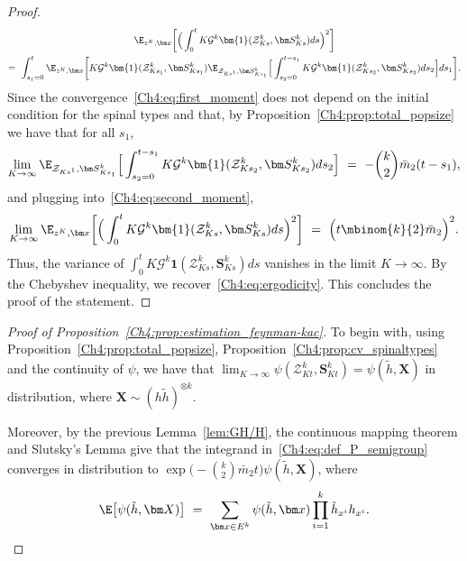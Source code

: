 \begin{refsegment}
\begin{proof}
\begin{multline}
  \E_{z^K,\bm x}\bigg[\Big(\int_0^t  K\mathcal{G}^k\bm{1}(\mathcal{Z}^k_{Ks}, \bm S^k_{Ks}) ds\Big)^2\bigg]\\
 =\ \int_{s_1=0}^t \E_{z^K,\bm x}\bigg[K\mathcal{G}^k\bm{1}(\mathcal{Z}^k_{Ks_1}, \bm S^k_{Ks_1}) \E_{\mathcal Z_{Ks^1}, \bm S^k_{Ks_1}}\Big[\int_{s_2=0}^{t-s_1}   K\mathcal{G}^k\bm{1}(\mathcal{Z}^k_{Ks_2}, \bm S^k_{Ks_2})ds_2\Big] ds_1\bigg].
    \end{multline}
Since the convergence~\eqref{Ch4:eq:first_moment} does not depend on the initial condition for the spinal types and that, by Proposition~\ref{Ch4:prop:total_popsize} we have that for all $s_1$, 
\[
  \lim_{K\to\infty}\E_{\mathcal Z_{Ks^1}, \bm S^k_{Ks_1}}\Big[\int_{s_2=0}^{t-s_1}   K\mathcal{G}^k\bm{1}(\mathcal{Z}^k_{Ks_2}, \bm S^k_{Ks_2})ds_2\Big]\ =\  -\binom{k}{2}\bar m_2 (t-s_1),
  \]
and plugging into~\eqref{Ch4:eq:second_moment},
\[
 \lim_{K\to\infty}\E_{z^K,\bm x}\bigg[\Big(\int_0^t  K\mathcal{G}^k\bm{1}(\mathcal{Z}^k_{Ks}, \bm S^k_{Ks}) ds\Big)^2\bigg]\ =\ \Big(t\mbinom{k}{2}\bar m_2\Big)^2 .
\]
Thus, the variance of $\int_0^t  K\mathcal{G}^k\bm{1}(\mathcal{Z}^k_{Ks}, \bm S^k_{Ks}) ds$ vanishes in the limit $K\to \infty$. By the Chebyshev inequality, we recover~\eqref{Ch4:eq:ergodicity}.
 This concludes the proof of the statement.
\end{proof}

\begin{proof}[Proof of Proposition~\ref{Ch4:prop:estimation_feynman-kac}]
To begin with, using Proposition~\ref{Ch4:prop:total_popsize}, Proposition~\ref{Ch4:prop:cv_spinaltypes} and the continuity of $\psi$, we have that $\lim_{K\to\infty }\psi(\mathcal{Z}^k_{Kt}, \bm S^k_{Kt}) =  \psi(\tilde h, \bm X)$
in distribution, where $\bm X\sim (h\tilde h)^{\otimes k}$.

Moreover, by the previous Lemma~\ref{lem:GH/H}, the continuous mapping theorem and Slutsky's Lemma give that the integrand in~\eqref{Ch4:eq:def_P_semigroup} converges in distribution to $\exp\big(-\binom{k}{2}\bar m_2
t\big)\psi(\tilde h,\bm X)$, where 
\[
\E\big[\psi(\tilde h,\bm X)\big]\ =\ \sum_{\bm x\in E^k}\psi(\tilde h,\bm x)\prod_{i=1}^k \tilde h_{x^i} h_{x^i}.
\]


\end{proof}
\end{refsegment}
